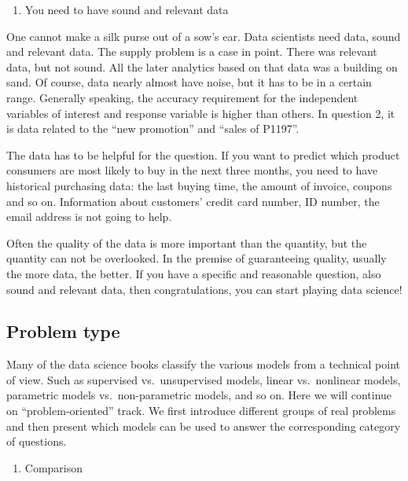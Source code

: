 \documentclass[]{book}
\providecommand{\tightlist}{%
  \setlength{\itemsep}{0pt}\setlength{\parskip}{0pt}}
\theoremstyle{definition}
\theoremstyle{definition}
\theoremstyle{remark}
\begin{document}
\begin{enumerate}
\def\labelenumi{\arabic{enumi}.}
\setcounter{enumi}{1}
\tightlist
\item
  You need to have sound and relevant data
\end{enumerate}

One cannot make a silk purse out of a sow's ear. Data scientists need
data, sound and relevant data. The supply problem is a case in point.
There was relevant data, but not sound. All the later analytics based on
that data was a building on sand. Of course, data nearly almost have
noise, but it has to be in a certain range. Generally speaking, the
accuracy requirement for the independent variables of interest and
response variable is higher than others. In question 2, it is data
related to the ``new promotion'' and ``sales of P1197''.

The data has to be helpful for the question. If you want to predict
which product consumers are most likely to buy in the next three months,
you need to have historical purchasing data: the last buying time, the
amount of invoice, coupons and so on. Information about customers'
credit card number, ID number, the email address is not going to help.

Often the quality of the data is more important than the quantity, but
the quantity can not be overlooked. In the premise of guaranteeing
quality, usually the more data, the better. If you have a specific and
reasonable question, also sound and relevant data, then congratulations,
you can start playing data science!

\subsection{Problem type}\label{problem-type}

Many of the data science books classify the various models from a
technical point of view. Such as supervised vs.~unsupervised models,
linear vs.~nonlinear models, parametric models vs.~non-parametric
models, and so on. Here we will continue on ``problem-oriented'' track.
We first introduce different groups of real problems and then present
which models can be used to answer the corresponding category of
questions.

\begin{enumerate}
\def\labelenumi{\arabic{enumi}.}
\tightlist
\item
  Comparison
\end{enumerate}
\end{document}
